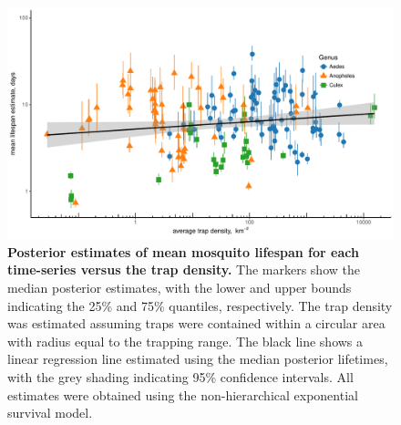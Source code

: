 \documentclass[12pt]{article}
\begin{document}
{\begin{figure}[h]
	\centerline{\includegraphics[width=1\textwidth]{./Figure_files/mrr_lifespanVsTrapDensity.pdf}}
	\caption{\textbf{Posterior estimates of mean mosquito lifespan for each time-series versus the trap density.} The markers show the median posterior estimates, with the lower and upper bounds indicating the 25\% and 75\% quantiles, respectively. The trap density was estimated assuming traps were contained within a circular area with radius equal to the trapping range. The black line shows a linear regression line estimated using the median posterior lifetimes, with the grey shading indicating 95\% confidence intervals. All estimates were obtained using the non-hierarchical exponential survival model.}
	\label{fig:mrr_lifeSpanVsTrapDensity}
\end{figure}

}
\end{document}
